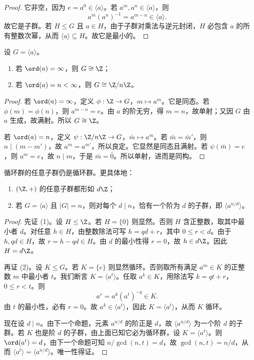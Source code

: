 \begin{proof}
它非空，因为 $e=a^0\in \langle a \rangle$。若 $a^m,a^n\in \langle a \rangle$，则
\[
 a^m(a^n)^{-1}=a^{m-n} \in \langle a \rangle.
\]
故它是子群。若 $H\le G$ 且 $a\in H$，由于子群对乘法与逆元封闭，$H$ 必包含 $a$ 的所有整数次幂，从而 $\langle a \rangle\subseteq H$。故它是最小的。
\end{proof}

\begin{theorem}[循环群分类]
设 $G=\langle a \rangle$。
\begin{enumerate}[label=\textnormal{(\arabic*)}, leftmargin=3em]
  \item 若 $\ord(a)=\infty$，则 $G\cong \Z$；
  \item 若 $\ord(a)=n<\infty$，则 $G\cong \Z/n\Z$。
\end{enumerate}
\end{theorem}

\begin{proof}
若 $\ord(a)=\infty$，定义 $\phi:\Z\to G$，$m\mapsto a^m$。它是同态。若 $\phi(m)=\phi(n)$，则 $a^{m-n}=e$。由 $a$ 的阶无穷，得 $m=n$，故单射；又因 $G$ 由 $a$ 生成，故满射。所以 $G\cong \Z$。

若 $\ord(a)=n$，定义 $\psi:\Z/n\Z\to G$，$\bar m\mapsto a^m$。若 $\bar m=\bar m'$，则 $n\mid(m-m')$，故 $a^m=a^{m'}$，所以良定。它显然是同态且满射。若 $\psi(\bar m)=e$，则 $a^m=e$，故 $n\mid m$，于是 $\bar m=\bar 0$。所以单射，进而是同构。
\end{proof}

\begin{theorem}[循环群的子群]
循环群的任意子群仍是循环群。更具体地：
\begin{enumerate}[label=\textnormal{(\arabic*)}, leftmargin=3em]
  \item $(\Z,+)$ 的任意子群都形如 $d\Z$；
  \item 若 $G=\langle a \rangle$ 且 $|G|=n$，则对每个 $d\mid n$，恰有一个阶为 $d$ 的子群，即 $\langle a^{n/d} \rangle$。
\end{enumerate}
\end{theorem}

\begin{proof}
先证 (1)。设 $H\le \Z$。若 $H=\{0\}$ 则显然。否则 $H$ 含正整数，取其中最小者 $d$。对任意 $h\in H$，由整数除法可写 $h=qd+r$，其中 $0\le r<d$。由于 $h,qd\in H$，故 $r=h-qd\in H$。由 $d$ 的最小性得 $r=0$，故 $h\in d\Z$。因此 $H=d\Z$。

再证 (2)。设 $K\le G$。若 $K=\{e\}$ 则显然循环。否则取所有满足 $a^m\in K$ 的正整数 $m$ 中最小者 $t$。我们断言 $K=\langle a^t \rangle$。任取 $a^k\in K$，用除法写 $k=qt+r$，$0\le r<t$。则
\[
 a^r=a^k(a^t)^{-q} \in K.
\]
由 $t$ 的最小性，必有 $r=0$。故 $a^k\in \langle a^t \rangle$，因此 $K=\langle a^t \rangle$，从而 $K$ 循环。

现在设 $d\mid n$。由下一个命题，元素 $a^{n/d}$ 的阶正是 $d$，故 $\langle a^{n/d} \rangle$ 为一个阶 $d$ 的子群。若 $K$ 也是阶 $d$ 的子群，由上面已知它必为循环群，设 $K=\langle a^t \rangle$。则 $\ord(a^t)=d$，由下一个命题可知 $n/\gcd(n,t)=d$，故 $\gcd(n,t)=n/d$，从而 $\langle a^t \rangle=\langle a^{n/d} \rangle$。唯一性得证。
\end{proof}

